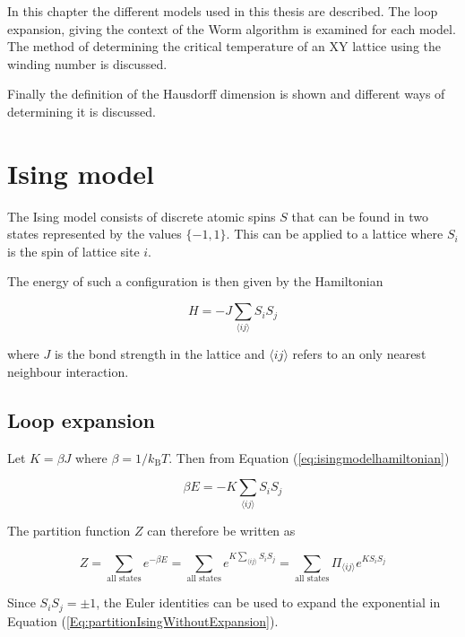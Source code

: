 In this chapter the different models used in this thesis are described. The loop expansion, giving the context of the Worm algorithm is examined for each model. The method of determining the critical temperature of an XY lattice using the winding number is discussed.

Finally the definition of the Hausdorff dimension is shown and different ways of determining it is discussed.

\section{Ising model}

The Ising model consists of discrete atomic spins $S$ that can be found in two states represented by the values $\{-1, 1\}$. This can be applied to a lattice where $S_i$ is the spin of lattice site $i$.

The energy of such a configuration is then given by the Hamiltonian

\begin{equation}
    H = - J \sum_{\langle ij \rangle} S_i S_j
\label{eq:isingmodelhamiltonian}
\end{equation}

where $J$ is the bond strength in the lattice and $\langle ij \rangle$ refers to an only nearest neighbour interaction.

\subsection{Loop expansion}
\label{subsec:IsingLoopExpansion}

Let $K = \beta J$ where $\beta = 1/k_{\text{B}} T$. Then from Equation (\ref{eq:isingmodelhamiltonian})

\begin{equation}
    \beta E = - K \sum_{\langle ij \rangle} S_i S_j
\end{equation}

The partition function $Z$ can therefore be written as

\begin{equation}
    Z = \sum_{\text{all states}} e^{-\beta E} = \sum_{\text{all states}} e^{K \sum_{\langle ij \rangle} S_i S_j} = \sum_{\text{all states}} \Pi_{\langle ij \rangle} e^{K S_i S_j}
\label{Eq:partitionIsingWithoutExpansion}
\end{equation}

Since $S_i S_j = \pm 1$, the Euler identities can be used to expand the exponential in Equation (\ref{Eq:partitionIsingWithoutExpansion}).


